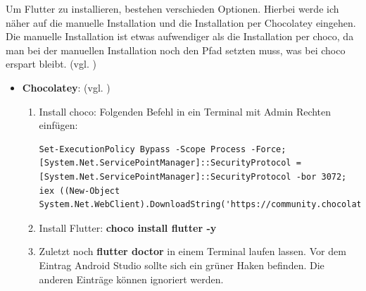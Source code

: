 Um Flutter zu installieren, bestehen verschieden Optionen. Hierbei werde ich näher auf die manuelle Installation und die Installation per Chocolatey eingehen. Die manuelle Installation ist etwas aufwendiger als die Installation per choco, da man bei der manuellen Installation noch den Pfad setzten muss, was bei choco erspart bleibt. (vgl. \cite{FlutterInstall})
\begin{itemize}
    \item \textbf{Chocolatey}: (vgl. \cite{Choco})
    \begin{enumerate}
        \item Install choco: Folgenden Befehl in ein Terminal mit Admin Rechten einfügen: 
        \begin{lstlisting}[style=flutterListingStyle,caption={Choco installieren}] 
        Set-ExecutionPolicy Bypass -Scope Process -Force; [System.Net.ServicePointManager]::SecurityProtocol = [System.Net.ServicePointManager]::SecurityProtocol -bor 3072; iex ((New-Object System.Net.WebClient).DownloadString('https://community.chocolatey.org/install.ps1'))\end{lstlisting}
        \item Install Flutter: \textbf{choco install flutter -y}
        \item Zuletzt noch \textbf{flutter doctor} in einem Terminal laufen lassen. Vor dem Eintrag Android Studio sollte sich ein grüner Haken befinden. Die anderen Einträge können ignoriert werden.
    \end{enumerate}


\end{itemize}
